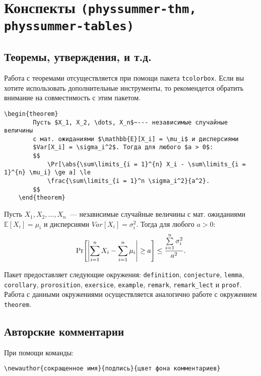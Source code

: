 \section{Конспекты \texttt{(physsummer-thm, physsummer-tables)}}

\subsection{Теоремы, утверждения, и т.д.}

Работа с теоремами отсуществляется при помощи пакета \texttt{tcolorbox}. Если вы хотите использовать
дополнительные инструменты, то рекомендется обратить внимание на совместимость с этим пакетом.

\begin{lstlisting}[gobble = 3]
    \begin{theorem}
        Пусть $X_1, X_2, \dots, X_n$~--- независимые случайные величины
        с мат. ожиданиями $\mathbb{E}[X_i] = \mu_i$ и дисперсиями
        $Var[X_i] = \sigma_i^2$. Тогда для любого $a > 0$:
        $$
            \Pr[\abs{\sum\limits_{i = 1}^{n} X_i - \sum\limits_{i = 1}^{n} \mu_i} \ge a] \le 
            \frac{\sum\limits_{i = 1}^n \sigma_i^2}{a^2}.
        $$
    \end{theorem}
\end{lstlisting}

\begin{theorem}
    Пусть $X_1, X_2, \dots, X_n$~--- независимые случайные величины с мат. ожиданиями $\mathbb{E}[X_i] =
    \mu_i$ и дисперсиями $Var[X_i] = \sigma_i^2$. Тогда для любого $a > 0$:
    $$
        \Pr[\abs{\sum\limits_{i = 1}^{n} X_i - \sum\limits_{i = 1}^{n} \mu_i} \ge a] \le
        \frac{\sum\limits_{i = 1}^n \sigma_i^2}{a^2}.
    $$
\end{theorem}

Пакет предоставляет следующие окружения: \texttt{definition}, \texttt{conjecture}, \texttt{lemma},
\texttt{corollary}, \texttt{prorosition}, \texttt{exersice}, \texttt{example}, \texttt{remark},
\texttt{remark\_lect} и \texttt{proof}. Работа с данными окружениями осуществляется аналогично работе с
окружением \texttt{theorem}.


\subsection{Авторские комментарии}
\label{sec:authors}

При помощи команды:
\begin{lstlisting}[gobble = 3]
    \newauthor{сокращенное имя}{подпись}{цвет фона комментариев}
\end{lstlisting}

